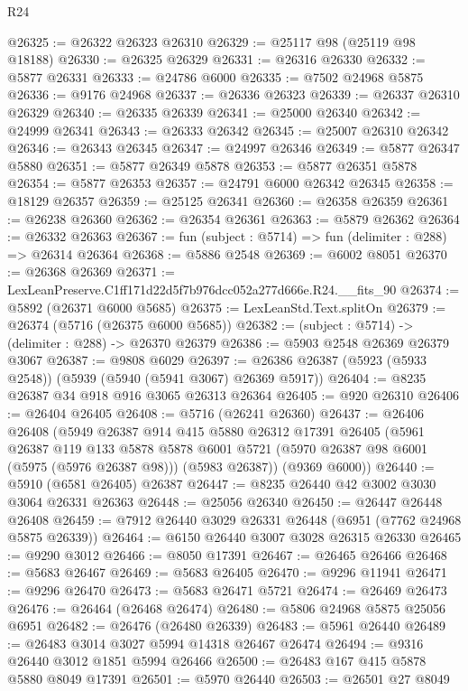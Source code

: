 \begin{lexlean}{R24}
\begin{coremodule}
@26325 := @26322 @26323 @26310
@26329 := @25117 @98 (@25119 @98 @18188)
@26330 := @26325 @26329
@26331 := @26316 @26330
@26332 := @5877 @26331
@26333 := @24786 @6000
@26335 := @7502 @24968 @5875
@26336 := @9176 @24968
@26337 := @26336 @26323
@26339 := @26337 @26310 @26329
@26340 := @26335 @26339
@26341 := @25000 @26340
@26342 := @24999 @26341
@26343 := @26333 @26342
@26345 := @25007 @26310 @26342
@26346 := @26343 @26345
@26347 := @24997 @26346
@26349 := @5877 @26347 @5880
@26351 := @5877 @26349 @5878
@26353 := @5877 @26351 @5878
@26354 := @5877 @26353
@26357 := @24791 @6000 @26342 @26345
@26358 := @18129 @26357
@26359 := @25125 @26341
@26360 := @26358 @26359
@26361 := @26238 @26360
@26362 := @26354 @26361
@26363 := @5879 @26362
@26364 := @26332 @26363
@26367 := fun (subject : @5714) => fun (delimiter : @288) => @26314 @26364
@26368 := @5886 @2548
@26369 := @6002 @8051
@26370 := @26368 @26369
@26371 := LexLeanPreserve.C1ff171d22d5f7b976dcc052a277d666e.R24.__fits_90
@26374 := @5892 (@26371 @6000 @5685)
@26375 := LexLeanStd.Text.splitOn
@26379 := @26374 (@5716 (@26375 @6000 @5685))
@26382 := (subject : @5714) -> (delimiter : @288) -> @26370 @26379
@26386 := @5903 @2548 @26369 @26379 @3067
@26387 := @9808 @6029
@26397 := @26386 @26387 (@5923 (@5933 @2548)) (@5939 (@5940 (@5941 @3067) @26369 @5917))
@26404 := @8235 @26387 @34 @918 @916 @3065 @26313 @26364
@26405 := @920 @26310
@26406 := @26404 @26405
@26408 := @5716 (@26241 @26360)
@26437 := @26406
    @26408
    (@5949
      @26387
      @914
      @415
      @5880
      @26312
      @17391
      @26405
      (@5961
        @26387
        @119
        @133
        @5878
        @5878
        @6001
        @5721
        (@5970 @26387 @98 @6001 (@5975 (@5976 @26387 @98)))
        (@5983 @26387))
      (@9369 @6000))
@26440 := @5910 (@6581 @26405) @26387
@26447 := @8235 @26440 @42 @3002 @3030 @3064 @26331 @26363
@26448 := @25056 @26340
@26450 := @26447 @26448 @26408
@26459 := @7912 @26440 @3029 @26331 @26448 (@6951 (@7762 @24968 @5875 @26339))
@26464 := @6150 @26440 @3007 @3028 @26315 @26330
@26465 := @9290 @3012
@26466 := @8050 @17391
@26467 := @26465 @26466
@26468 := @5683 @26467
@26469 := @5683 @26405
@26470 := @9296 @11941
@26471 := @9296 @26470
@26473 := @5683 @26471 @5721
@26474 := @26469 @26473
@26476 := @26464 (@26468 @26474)
@26480 := @5806 @24968 @5875 @25056 @6951
@26482 := @26476 (@26480 @26339)
@26483 := @5961 @26440
@26489 := @26483 @3014 @3027 @5994 @14318 @26467 @26474
@26494 := @9316 @26440 @3012 @1851 @5994 @26466
@26500 := @26483 @167 @415 @5878 @5880 @8049 @17391
@26501 := @5970 @26440
@26503 := @26501 @27 @8049

\end{coremodule}
\end{lexlean}
